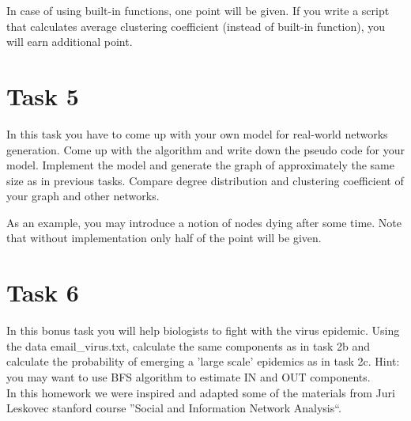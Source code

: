 \documentclass{article}
\begin{document}
In case of using built-in functions, one point will be given. If you write a script that calculates average clustering coefficient (instead of built-in function), you will earn additional point.

\section*{Task 5}
In this task you have to come up with your own model for real-world networks generation. Come up with the algorithm and write down the pseudo code for your model. Implement the model and generate the graph of approximately the same size as in previous tasks. Compare degree distribution and clustering coefficient of your graph and other networks.

As an example, you may introduce a notion of nodes dying after some time.
Note that without implementation only half of the point will be given.

\section*{Task 6}
In this bonus task you will help biologists to fight with the virus epidemic. Using the data email\_virus.txt, calculate the same components as in task 2b and calculate the probability of emerging a 'large scale' epidemics as in task 2c. Hint: you may want to use BFS algorithm to estimate IN and OUT components.
\medskip
\\
In this homework we were inspired and adapted some of the materials from Juri Leskovec stanford course ''Social and Information Network Analysis``. 
\end{document}
